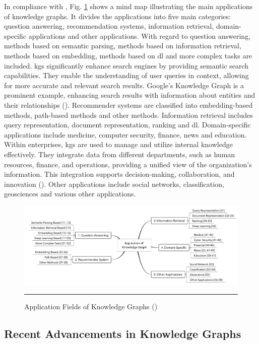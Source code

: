 In compliance with \cite{Zou2020}, Fig. \ref{fig:kg-application-fields} shows a mind map illustrating the main applications of knowledge graphs. It divides the applications into five main categories: question answering, recommendation systems, information retrieval, domain-specific applications and other applications. With regard to question answering, methods based on semantic parsing, methods based on information retrieval, methods based on embedding, methods based on \gls{dl} and more complex tasks are included.
\glspl{kg} significantly enhance search engines by providing semantic search capabilities. They enable the understanding of user queries in context, allowing for more accurate and relevant search results. Google's Knowledge Graph is a prominent example, enhancing search results with information about entities and their relationships (\cite{singhal2012introducing}).
Recommender systems are classified into embedding-based methods, path-based methods and other methods. Information retrieval includes query representation, document representation, ranking and \gls{dl}. Domain-specific applications include medicine, computer security, finance, news and education.
Within enterprises, \glspl{kg} are used to manage and utilize internal knowledge effectively. They integrate data from different departments, such as human resources, finance, and operations, providing a unified view of the organization's information. This integration supports decision-making, collaboration, and innovation (\cite{pujara2013knowledge}).
Other applications include social networks, classification, geosciences and various other applications.

\begin{figure}[htbp]
	   \centering
    \includegraphics[width=\textwidth]{03_Figures/literature-review/kg-application-fields.png}
		\rule{35em}{0.5pt}
	   \caption{Application Fields of Knowledge Graphs (\cite{Zou2020})} 
    \label{fig:kg-application-fields}
\end{figure}

\subsection*{Recent Advancements in Knowledge Graphs}

